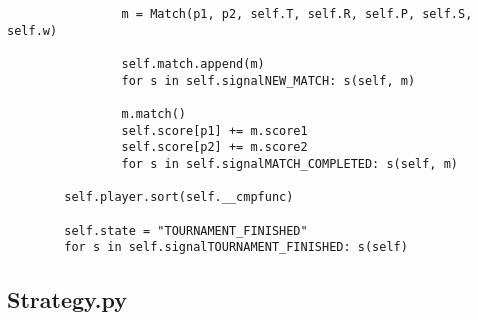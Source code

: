 \documentclass[12pt,a4paper,ngerman]{article}
\begin{document}
\begin{scriptsize}
\begin{verbatim}
                m = Match(p1, p2, self.T, self.R, self.P, self.S, self.w)

                self.match.append(m)
                for s in self.signalNEW_MATCH: s(self, m)
                
                m.match()
                self.score[p1] += m.score1
                self.score[p2] += m.score2
                for s in self.signalMATCH_COMPLETED: s(self, m)

        self.player.sort(self.__cmpfunc)

        self.state = "TOURNAMENT_FINISHED"
        for s in self.signalTOURNAMENT_FINISHED: s(self)

\end{verbatim}
\end{scriptsize}

\newpage

\subsection{Strategy.py}
\end{document}
